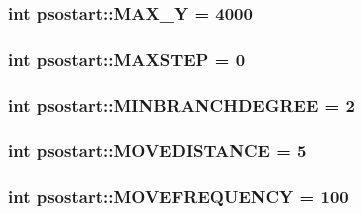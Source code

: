 \hypertarget{namespacepsostart_69037b57c1ff25824dbcbbe17807d2d7}{
\subsubsection{\setlength{\rightskip}{0pt plus 5cm}int {\bf psostart::MAX\_\-Y} = 4000}}
\label{namespacepsostart_69037b57c1ff25824dbcbbe17807d2d7}


\hypertarget{namespacepsostart_4eb0db99f944d03199e893e85f1a9e1d}{
\subsubsection{\setlength{\rightskip}{0pt plus 5cm}int {\bf psostart::MAXSTEP} = 0}}
\label{namespacepsostart_4eb0db99f944d03199e893e85f1a9e1d}


\hypertarget{namespacepsostart_68dd12c702b13dada8e2cf3f4d5bfd0e}{
\subsubsection{\setlength{\rightskip}{0pt plus 5cm}int {\bf psostart::MINBRANCHDEGREE} = 2}}
\label{namespacepsostart_68dd12c702b13dada8e2cf3f4d5bfd0e}


\hypertarget{namespacepsostart_509e6c062fe0b5ac8f25398216e67f89}{
\subsubsection{\setlength{\rightskip}{0pt plus 5cm}int {\bf psostart::MOVEDISTANCE} = 5}}
\label{namespacepsostart_509e6c062fe0b5ac8f25398216e67f89}


\hypertarget{namespacepsostart_b2a0815fb64577d432f816c6cd0f9178}{
\subsubsection{\setlength{\rightskip}{0pt plus 5cm}int {\bf psostart::MOVEFREQUENCY} = 100}}
\label{namespacepsostart_b2a0815fb64577d432f816c6cd0f9178}



